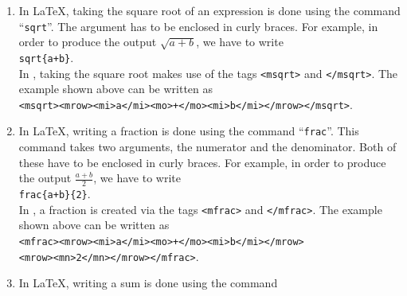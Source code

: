 \begin{enumerate}
      \\[0.2cm]
      \hspace*{1.3cm}
      \texttt{x\{2\}}.
      \\[0.2cm]
      In , raising an expression to a power is achieved using the tags
      \texttt{<msup>} and \texttt{</msup>}.  This tag takes two arguments: the base and the exponent.
      For example, in order to display the term $x^2$, we have to write  
      \\[0.2cm]
      \hspace*{1.3cm}
      \texttt{<msup><mi>x</mi><mrow><mn>2</mn></mrow></msup>}.
\item In \LaTeX, taking the square root of an expression is done using the command
      ``\texttt{sqrt}''.  The argument has to be enclosed in curly braces.
      For example, in order to produce the output $\sqrt{a+b}$, we have to write
      \\[0.2cm]
      \hspace*{1.3cm}
      \texttt{sqrt\{a+b\}}.
      \\[0.2cm]
      In , taking the square root makes use of the tags \texttt{<msqrt>} 
      and \texttt{</msqrt>}.  The example shown above can be written as
      \\[0.2cm]
      \hspace*{1.3cm}
      \texttt{<msqrt><mrow><mi>a</mi><mo>+</mo><mi>b</mi></mrow></msqrt>}.
\item In \LaTeX, writing a fraction is done using the command
      ``\texttt{frac}''.  This command takes two arguments, the numerator and the
      denominator.  Both of these have to be enclosed in curly braces.
      For example, in order to produce the output $\frac{a+b}{2}$, we have to write
      \\[0.2cm]
      \hspace*{1.3cm}
      \texttt{frac\{a+b\}\{2\}}.
      \\[0.2cm]
      In , a fraction is created via the tags \texttt{<mfrac>} 
      and \texttt{</mfrac>}.  The example shown above can be written as
      \\[0.2cm]
      \hspace*{1.3cm}
      \texttt{<mfrac><mrow><mi>a</mi><mo>+</mo><mi>b</mi></mrow>}
      \\
      \hspace*{1.3cm}
      \texttt{\phantom{<mfrac>}<mrow><mn>2</mn></mrow></mfrac>}.
\item In \LaTeX, writing a sum is done using the command

\end{enumerate}
